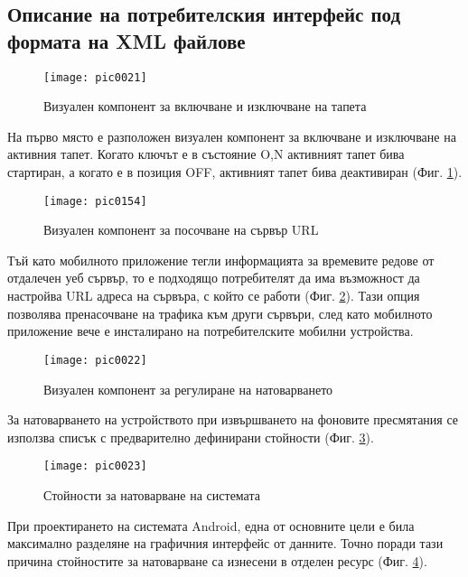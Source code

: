 \subsection{Описание на потребителския интерфейс под формата на XML файлове}

\begin{figure}[h]
  \centering
  \texttt{[image: pic0021]}
  \caption{Визуален компонент за включване и изключване на тапета}
\label{fig:pic0021}
\end{figure}
\FloatBarrier

На първо място е разположен визуален компонент за включване и изключване на активния тапет. Когато ключът е в състояние O,N активният тапет бива стартиран, а когато е в позиция OFF, активният тапет бива деактивиран (Фиг. \ref{fig:pic0021}). 

\begin{figure}[h]
  \centering
  \texttt{[image: pic0154]}
  \caption{Визуален компонент за посочване на сървър URL}
\label{fig:pic0154}
\end{figure}
\FloatBarrier

Тъй като мобилното приложение тегли информацията за времевите редове от отдалечен уеб сървър, то е подходящо потребителят да има възможност да настройва URL адреса на сървъра, с който се работи (Фиг. \ref{fig:pic0154}). Тази опция позволява пренасочване на трафика към други сървъри, след като мобилното приложение вече е инсталирано на потребителските мобилни устройства.

\begin{figure}[h]
  \centering
  \texttt{[image: pic0022]}
  \caption{Визуален компонент за регулиране на натоварването}
\label{fig:pic0022}
\end{figure}
\FloatBarrier

За натоварването на устройството при извършването на фоновите пресмятания се използва списък с предварително дефинирани стойности (Фиг. \ref{fig:pic0022}). 

\begin{figure}[h]
  \centering
  \texttt{[image: pic0023]}
  \caption{Стойности за натоварване на системата}
\label{fig:pic0023}
\end{figure}
\FloatBarrier

При проектирането на системата Android, една от основните цели е била максимално разделяне на графичния интерфейс от данните. Точно поради тази причина стойностите за натоварване са изнесени в отделен ресурс (Фиг. \ref{fig:pic0023}).

